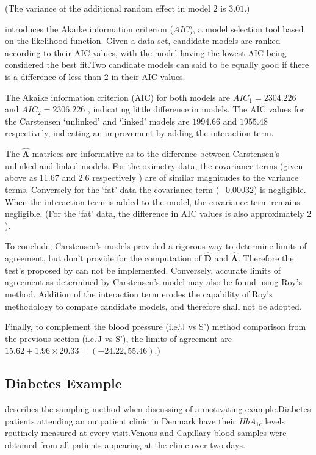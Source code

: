 \documentclass[12pt, a4paper]{report}
\theoremstyle{plain}
\theoremstyle{definition}
\theoremstyle{remark}
\begin{document}
	\noindent (The variance of the additional random effect in model $2$ is $3.01$.)
	
	\citet{akaike} introduces the Akaike information criterion ($AIC$), a model
	selection tool based on the likelihood function. Given a data set, candidate models
	are ranked according to their AIC values, with the model having the lowest AIC being considered the best fit.Two candidate models can said to be equally good if there is a difference of less than $2$ in their AIC values.
	
	The Akaike information criterion (AIC) for both models are $AIC_{1} = 2304.226$ and $AIC_{2} = 2306.226$ , indicating little difference in models. The AIC values for the Carstensen `unlinked' and `linked' models are $1994.66$ and $1955.48$ respectively, indicating an improvement by adding the interaction term.
	
	The $\boldsymbol{\hat{\Lambda}}$ matrices are informative as to the difference between Carstensen's unlinked and linked models. For the oximetry data, the covariance terms (given above as 11.67 and 2.6 respectively ) are of similar magnitudes to the variance terms. Conversely for the `fat' data the covariance term ($-0.00032$) is negligible. When the interaction term is added to the model, the covariance term remains negligible. (For the `fat' data, the difference in AIC values is also approximately $2$).
	
	To conclude, Carstensen's models provided a rigorous way to determine limits of agreement, but don't provide for the computation of $\boldsymbol{\hat{D}}$ and $\boldsymbol{\hat{\Lambda}}$. Therefore the test's proposed by \citet{roy} can not be implemented. Conversely, accurate limits of agreement as determined by Carstensen's model may also be found using Roy's method. Addition of the interaction term erodes the capability of Roy's methodology to compare candidate models, and therefore shall not be adopted.
	
	Finally, to complement the blood pressure (i.e.`J vs S') method comparison from the previous section (i.e.`J vs S'), the limits of agreement are $15.62 \pm 1.96 \times 20.33 = (-24.22, 55.46)$.)
	\newpage
		
	\subsection{Diabetes Example}
	\citet{bxc2008} describes the sampling method when discussing of a motivating example.Diabetes patients attending an outpatient clinic in Denmark have their $HbA_{1c}$ levels routinely measured at every visit.Venous and Capillary blood samples were obtained from all patients appearing at the clinic over two days.
	
\end{document}

